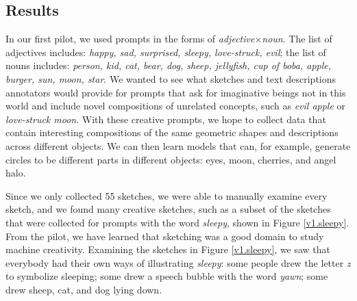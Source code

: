 
\subsection{Results}
In our first pilot, we used prompts in the forms of \textit{adjective}$\times$\textit{noun}. 
The list of adjectives includes: \textit{happy, sad, surprised, sleepy, love-struck, evil}; the list of nouns includes: 
\textit{person, kid, cat, bear, dog, sheep, jellyfish, cup of boba, apple, burger, sun, moon, star}. 
We wanted to see what sketches and text descriptions annotators would provide for prompts that ask for imaginative beings not in this world and include novel compositions of unrelated concepts, such as \textit{evil apple} or \textit{love-struck moon}. 
With these creative prompts, we hope to collect data that contain interesting compositions of the same geometric shapes and descriptions across different objects. 
We can then learn models that can, for example, generate circles to be different parts in different objects: eyes, moon, cherries, and angel halo. 


Since we only collected 55 sketches, we were able to manually examine every sketch, and we found many creative sketches, such as a subset of the sketches that were collected for prompts with the word \textit{sleepy}, shown in Figure \ref{v1.sleepy}. From the pilot, we have learned that sketching was a good domain to study machine creativity. Examining the sketches in Figure \ref{v1.sleepy}, we saw that everybody had their own ways of illustrating \textit{sleepy}: some people drew the letter \textit{z} to symbolize sleeping; some drew a speech bubble with the word \textit{yawn}; some drew sheep, cat, and dog lying down.  


